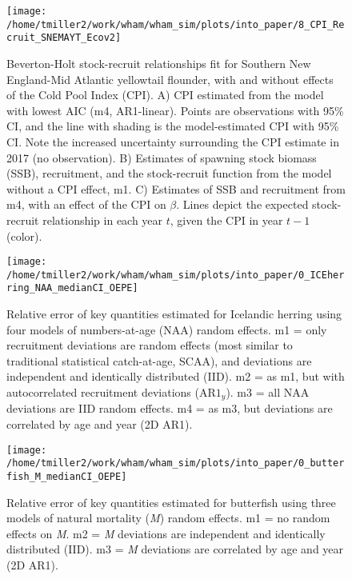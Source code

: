 \documentclass[]{article}
\begin{document}
\begin{figure}

{\centering \texttt{[image: /home/tmiller2/work/wham/wham\_sim/plots/into\_paper/8\_CPI\_Recruit\_SNEMAYT\_Ecov2]} 

}

\caption{Beverton-Holt stock-recruit relationships fit for Southern New England-Mid Atlantic yellowtail flounder, with and without effects of the Cold Pool Index (CPI). A) CPI estimated from the model with lowest AIC (m4, AR1-linear). Points are observations with 95\% CI, and the line with shading is the model-estimated CPI with 95\% CI. Note the increased uncertainty surrounding the CPI estimate in 2017 (no observation). B) Estimates of spawning stock biomass (SSB), recruitment, and the stock-recruit function from the model without a CPI effect, m1. C) Estimates of SSB and recruitment from m4, with an effect of the CPI on $\beta$. Lines depict the expected stock-recruit relationship in each year $t$, given the CPI in year $t-1$ (color).}\label{fig:devs-SNEMAYT-ecov}
\end{figure}

\pagebreak

\begin{figure}

{\centering \texttt{[image: /home/tmiller2/work/wham/wham\_sim/plots/into\_paper/0\_ICEherring\_NAA\_medianCI\_OEPE]} 

}

\caption{Relative error of key quantities estimated for Icelandic herring using four models of numbers-at-age (NAA) random effects. m1 = only recruitment deviations are random effects (most similar to traditional statistical catch-at-age, SCAA), and deviations are independent and identically distributed (IID). m2 = as m1, but with autocorrelated recruitment deviations ($\text{AR1}_y$). m3 = all NAA deviations are IID random effects. m4 = as m3, but deviations are correlated by age and year (2D AR1).}\label{fig:rel-error-ICEherring-naa}
\end{figure}

\pagebreak

\begin{figure}

{\centering \texttt{[image: /home/tmiller2/work/wham/wham\_sim/plots/into\_paper/0\_butterfish\_M\_medianCI\_OEPE]} 

}

\caption{Relative error of key quantities estimated for butterfish using three models of natural mortality (\textit{M}) random effects. m1 = no random effects on \textit{M}. m2 = \textit{M} deviations are independent and identically distributed (IID). m3 = \textit{M} deviations are correlated by age and year (2D AR1).}\label{fig:rel-error-butterfish-m}
\end{figure}
\end{document}
